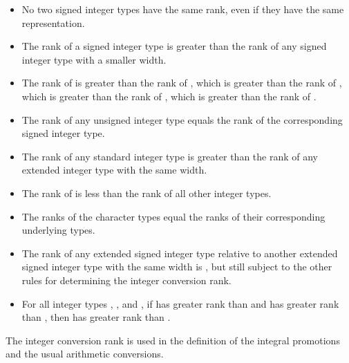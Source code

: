 \begin{itemize}
\item No two signed integer types
have the same rank, even if they have
the same representation.

\item The rank of a signed integer type is greater than the rank
of any signed integer type with a smaller width.

\item The rank of  is greater
than the rank of , which is greater than
the rank of , which is greater than the rank of
, which is greater than the rank of
.

\item The rank of any unsigned integer type equals the rank of the
corresponding signed integer type.

\item The rank of any standard integer type is greater than the
rank of any extended integer type with the same width.

\item The rank of  is less than the rank of all
other integer types.

\item
The ranks of the character types
equal the ranks of their corresponding underlying
types.

\item The rank of any extended signed integer type relative to another
extended signed integer type with the same width is , but still subject to the other rules for determining the integer
conversion rank.

\item For all integer types , , and , if
 has greater rank than  and  has greater
rank than , then  has greater rank than
.
\end{itemize}

\begin{note}
The integer conversion rank is used in the definition of the integral
promotions and the usual arithmetic
conversions.
\end{note}


